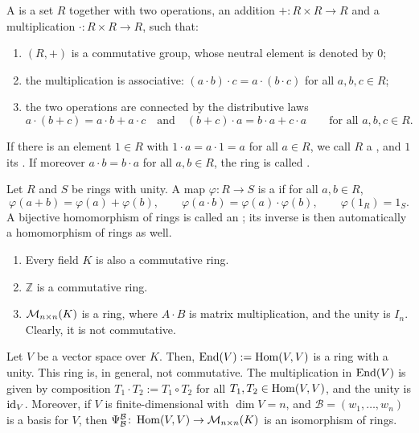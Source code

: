 \begin{aidefinition}[Ring]
\label{aidef:ring}
A  is a set $R$ together with two operations, an addition $+ \colon R \times R \to R$ and a multiplication $\cdot \colon R \times R \to R$, such that:
\begin{enumerate}[label=\textbf{(\alph*)}]
    \item $(R, +)$ is a commutative group, whose neutral element is denoted by $0$;
    \item the multiplication is associative: $(a \cdot b) \cdot c = a \cdot (b \cdot c)$ for all $a, b, c \in R$;
    \item the two operations are connected by the distributive laws
    \[
    a \cdot (b + c) = a \cdot b + a \cdot c \quad \text{and} \quad (b + c) \cdot a = b \cdot a + c \cdot a \qquad \text{for all } a,b,c \in R.
    \]
\end{enumerate}
If there is an element $1 \in R$ with $1 \cdot a = a \cdot 1 = a$ for all $a \in R$, we call $R$ a , and $1$ its . If moreover $a \cdot b = b \cdot a$ for all $a, b \in R$, the ring is called .
\end{aidefinition}

\begin{aidefinition}
\label{aidef:ring_homomorphism}
Let $R$ and $S$ be rings with unity. A map $\varphi \colon R \to S$ is a  if for all $a, b \in R$,
\[
\varphi(a + b) = \varphi(a) + \varphi(b), \qquad \varphi(a \cdot b) = \varphi(a) \cdot \varphi(b), \qquad \varphi(1_R) = 1_S.
\]
A bijective homomorphism of rings is called an ; its inverse is then automatically a homomorphism of rings as well.
\end{aidefinition}

\begin{example}
  \begin{enumerate}
    \item Every field $K$ is also a commutative ring.
    \item $\mathbb{Z}$ is a commutative ring.
    \item $\mathcal{M}_{n \times n}(K)$ is a ring, where $A \cdot B$ is matrix multiplication, and the unity is $I_n$. Clearly, it is not commutative.
  \end{enumerate}
\end{example}

\begin{corollary}
  \label{cor:endomorphism_ring}
  Let $V$ be a vector space over $K$. Then, $\operatorname{End}(V) := \operatorname{Hom}(V,V)$ is a ring with a unity. This ring is, in general, not commutative. The multiplication in $\operatorname{End}(V)$ is given by composition $T_1 \cdot T_2 := T_1 \circ T_2$ for all $T_1, T_2 \in \operatorname{Hom}(V,V)$, and the unity is $\operatorname{id}_V$. Moreover, if $V$ is finite-dimensional with $\dim V = n$, and $\mathcal{B} = (w_1, \dots, w_n)$ is a basis for $V$, then $\Psi_{\mathcal{B}}^{\mathcal{B}} \colon \operatorname{Hom}(V,V) \to \mathcal{M}_{n \times n}(K)$ is an isomorphism of rings.
\end{corollary}

